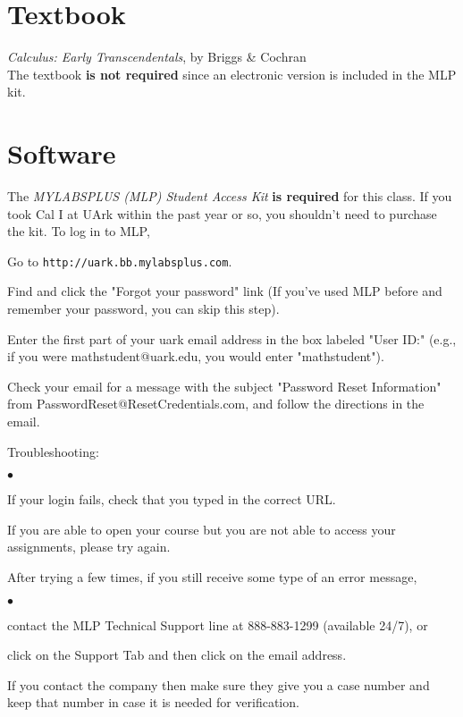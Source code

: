 \documentclass[margin,line,pifont,palatino,courier]{res}
\newenvironment{list1}{
  \begin{list}{\ding{113}}{%
      \setlength{\itemsep}{0in}
      \setlength{\parsep}{0in} \setlength{\parskip}{0in}
      \setlength{\topsep}{0in} \setlength{\partopsep}{0in}
      \setlength{\leftmargin}{0.17in}}}{\end{list}}
\newenvironment{list2}{
  \begin{list}{$\bullet$}{%
      \setlength{\itemsep}{0in}
      \setlength{\parsep}{0in} \setlength{\parskip}{0in}
      \setlength{\topsep}{0in} \setlength{\partopsep}{0in}
      \setlength{\leftmargin}{0.2in}}}{\end{list}}
\begin{document}
\begin{resume}
\section{\sc Textbook} \emph{Calculus: Early Transcendentals}, by Briggs \& Cochran \\
The textbook {\bf is not required} since an electronic version is included in the MLP kit.  

\section{\sc Software} The \emph{MYLABSPLUS (MLP) Student Access Kit} {\bf is required} for this class. If you took Cal I at UArk within the past year or so, you shouldn't need to purchase the kit. To log in to MLP, 
\begin{list1} 
\item Go to \verb+http://uark.bb.mylabsplus.com+. 
\item Find and click the "Forgot your password" link (If you've used MLP before and remember your password, you can skip this step).
\item Enter the first part of your uark email address in the box labeled "User ID:" (e.g., if you were mathstudent@uark.edu, you would enter "mathstudent").  
\item Check your email for a message with the subject "Password Reset Information" from PasswordReset@ResetCredentials.com, and follow the directions in the email.
\item Troubleshooting: 
	\begin{list2}
	\item If your login fails, check that you typed in the correct URL. 
	\item If you are able to open your course but you are not able to access your assignments, please try again.  
	\item After trying a few times, if you still receive some type of an error message,
		\begin{list2}
		\item contact the MLP Technical Support line at 888-883-1299 (available 24/7), or 
		\item click on the Support Tab and then click on the email address. 
		\end{list2}
	If you contact the company then make sure they give you a case number and keep that number in case it is needed for verification. 

\end{list2}
\end{list1}
\end{resume}
\end{document}
